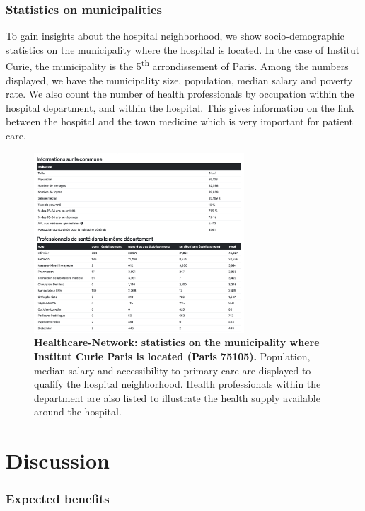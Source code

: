 \subsubsection{Statistics on municipalities}

To gain insights about the hospital neighborhood, we show socio-demographic statistics on the municipality where the hospital is located. In the case of Institut Curie, the municipality is the 5\textsuperscript{th} arrondissement of Paris. Among the numbers displayed, we have the municipality size, population, median salary and poverty rate. We also count the number of health professionals by occupation within the hospital department, and within the hospital. This gives information on the link between the hospital and the town medicine which is very important for patient care.

\begin{figure}[H]
    \includegraphics[width=0.7\textwidth]{images/healthcare-network/curie-commune.png}
    \centering
    \caption{
        \textbf{Healthcare-Network: statistics on the municipality where Institut Curie Paris is located (Paris 75105).} Population, median salary and accessibility to primary care are displayed to qualify the hospital neighborhood. Health professionals within the department are also listed to illustrate the health supply available around the hospital.
    }
    \label{fig:hn-curie-commune}
\end{figure}

\section{Discussion}

\subsubsection{Expected benefits}

